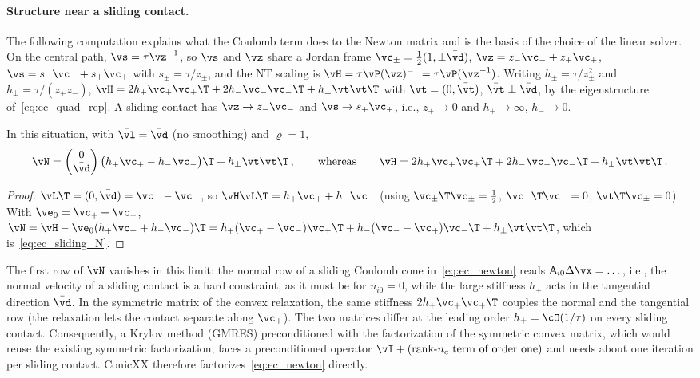 \paragraph{Structure near a sliding contact.} The following computation explains what the Coulomb term does to the Newton matrix and is the basis of the choice of the linear solver. On the central path, $\vs = \tau\vz^{-1}$, so $\vs$ and $\vz$ share a Jordan frame $\vc_\pm = \frac{1}{2}(1, \pm\bar{\vd})$, $\vz = z_-\vc_- + z_+\vc_+$, $\vs = s_-\vc_- + s_+\vc_+$ with $s_\pm = \tau/z_\pm$, and the NT scaling is $\vH = \tau\vP(\vz)^{-1} = \tau\vP(\vz^{-1})$. Writing $h_\pm = \tau/z_\pm^2$ and $h_{\perp} = \tau/(z_+z_-)$, $\vH = 2h_+\vc_+\vc_+\T + 2h_-\vc_-\vc_-\T + h_{\perp}\vt\vt\T$ with $\vt = (0, \bar{\vt})$, $\bar{\vt} \perp \bar{\vd}$, by the eigenstructure of~\eqref{eq:ec_quad_rep}. A sliding contact has $\vz \to z_-\vc_-$ and $\vs \to s_+\vc_+$, i.e., $z_+ \to 0$ and $h_+ \to \infty$, $h_- \to 0$.
%
\begin{proposition}\label{prop:ec_sliding_structure}
	In this situation, with $\bar{\vl} = \bar{\vd}$ (no smoothing) and $\varrho = 1$,
	\begin{equation}\label{eq:ec_sliding_N}
		\vN = \begin{pmatrix} 0 \\ \bar{\vd} \end{pmatrix}\big(h_+\vc_+ - h_-\vc_-\big)\T + h_{\perp}\vt\vt\T \, ,
		\qquad \text{whereas} \qquad
		\vH = 2h_+\vc_+\vc_+\T + 2h_-\vc_-\vc_-\T + h_{\perp}\vt\vt\T \, .
	\end{equation}
\end{proposition}
%
\begin{proof}
	$\vL\T = (0, \bar{\vd}) = \vc_+ - \vc_-$, so $\vH\vL\T = h_+\vc_+ + h_-\vc_-$ (using $\vc_\pm\T\vc_\pm = \frac{1}{2}$, $\vc_+\T\vc_- = 0$, $\vt\T\vc_\pm = 0$). With $\ve_0 = \vc_+ + \vc_-$,
	$\vN = \vH - \ve_0(h_+\vc_+ + h_-\vc_-)\T = h_+(\vc_+ - \vc_-)\vc_+\T + h_-(\vc_- - \vc_+)\vc_-\T + h_{\perp}\vt\vt\T$, which is~\eqref{eq:ec_sliding_N}.
\end{proof}
%
The first row of $\vN$ vanishes in this limit: the normal row of a sliding Coulomb cone in~\eqref{eq:ec_newton} reads $\mathsf{A}_{i0}\Delta\vx = \dots$, i.e., the normal velocity of a sliding contact is a hard constraint, as it must be for $u_{i0} = 0$, while the large stiffness $h_+$ acts in the tangential direction $\bar{\vd}$. In the symmetric matrix of the convex relaxation, the same stiffness $2h_+\vc_+\vc_+\T$ couples the normal and the tangential row (the relaxation lets the contact separate along $\vc_+$). The two matrices differ at the leading order $h_+ = \cO(1/\tau)$ on every sliding contact. Consequently, a Krylov method (GMRES) preconditioned with the factorization of the symmetric convex matrix, which would reuse the existing symmetric factorization, faces a preconditioned operator $\vI + \text{(rank-}n_c\text{ term of order one)}$ and needs about one iteration per sliding contact. ConicXX therefore factorizes~\eqref{eq:ec_newton} directly.
%
